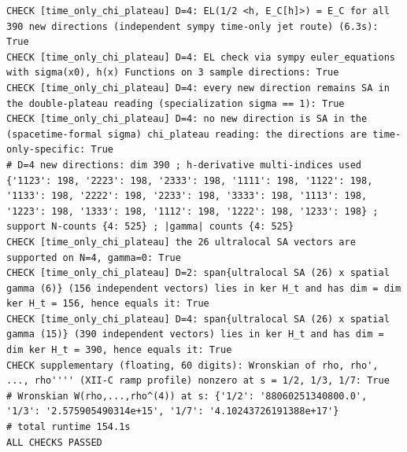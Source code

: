 \documentclass{article}
\theoremstyle{remark}
\begin{document}
\begin{lstlisting}
CHECK [time_only_chi_plateau] D=4: EL(1/2 <h, E_C[h]>) = E_C for all 390 new directions (independent sympy time-only jet route) (6.3s): True
CHECK [time_only_chi_plateau] D=4: EL check via sympy euler_equations with sigma(x0), h(x) Functions on 3 sample directions: True
CHECK [time_only_chi_plateau] D=4: every new direction remains SA in the double-plateau reading (specialization sigma == 1): True
CHECK [time_only_chi_plateau] D=4: no new direction is SA in the (spacetime-formal sigma) chi_plateau reading: the directions are time-only-specific: True
# D=4 new directions: dim 390 ; h-derivative multi-indices used {'1123': 198, '2223': 198, '2333': 198, '1111': 198, '1122': 198, '1133': 198, '2222': 198, '2233': 198, '3333': 198, '1113': 198, '1223': 198, '1333': 198, '1112': 198, '1222': 198, '1233': 198} ; support N-counts {4: 525} ; |gamma| counts {4: 525}
CHECK [time_only_chi_plateau] the 26 ultralocal SA vectors are supported on N=4, gamma=0: True
CHECK [time_only_chi_plateau] D=2: span{ultralocal SA (26) x spatial gamma (6)} (156 independent vectors) lies in ker H_t and has dim = dim ker H_t = 156, hence equals it: True
CHECK [time_only_chi_plateau] D=4: span{ultralocal SA (26) x spatial gamma (15)} (390 independent vectors) lies in ker H_t and has dim = dim ker H_t = 390, hence equals it: True
CHECK supplementary (floating, 60 digits): Wronskian of rho, rho', ..., rho'''' (XII-C ramp profile) nonzero at s = 1/2, 1/3, 1/7: True
# Wronskian W(rho,...,rho^(4)) at s: {'1/2': '88060251340800.0', '1/3': '2.575905490314e+15', '1/7': '4.10243726191388e+17'}
# total runtime 154.1s
ALL CHECKS PASSED
\end{lstlisting}
\end{document}

